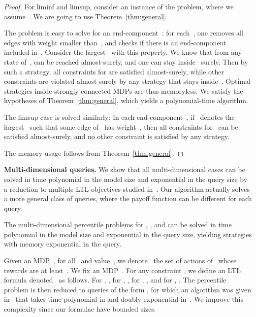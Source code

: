 \documentclass{llncs}
\begin{document}
\begin{proof}
  
  For liminf and limsup, consider an instance  of the problem, where we assume~.
  We are going to use Theorem~\ref{thm:general}.

  The problem is easy to solve for an end-component~: for each~, one removes all edges with weight smaller than~, and checks 
  if there is an end-component~ included in~. Consider the largest~ with this property. We know that from any state of~,
   can be reached almost-surely, and one can stay inside~ surely. Then by such a strategy, all constraints
   for  are satisfied almost-surely, 
  while other constraints are violated almost-surely by any strategy that stays inside~.
  Optimal strategies inside strongly connected MDPs are thus memoryless.
  We satisfy the hypotheses of Theorem~\ref{thm:general},
  which yields a polynomial-time algorithm.

  The limsup case is solved similarly: In each end-component~, if~ denotes the largest~ such that some edge of~ has weight~, then all constraints  
  for~ can be satisfied almost-surely, and no other constraint is satisfied by any strategy.
  
  The memory usage follows from Theorem~\ref{thm:general}.
\end{proof}



\smallskip\noindent\textbf{Multi-dimensional queries.}
\label{subsection:multi-simple}
We show that all multi-dimensional cases can be solved in time polynomial in the model size and exponential in the query size by a reduction to multiple LTL objectives studied in~\cite{EKVY-lmcs08}. 
Our algorithm actually solves a more general class of queries, where the payoff function can be different for each query.

\begin{theorem}
\label{thm:quant_reg_multi_dim}
  The multi-dimensional percentile problems for , ,  and  can be solved in time polynomial in the model size and exponential in the query size,
  yielding strategies with memory exponential in the query.
\end{theorem}

Given an MDP~, for all~ and value~, we denote~ the set of actions of~ whose rewards are at least~.  We fix an MDP~. 
 For any constraint , we define an LTL formula denoted~ as follows. For , , for , , for , , and for , .
The percentile problem is then reduced to queries of the form , 
for which an algorithm was given in~\cite{EKVY-lmcs08} that takes time polynomial in  and doubly exponential in~. We improve this complexity since our formulae have bounded sizes.
\end{document}
